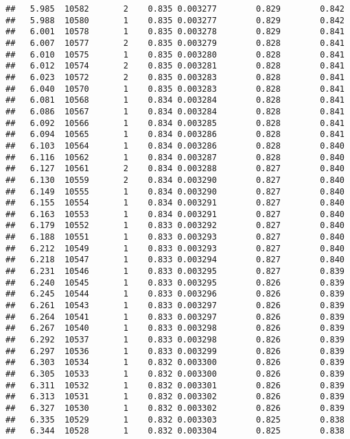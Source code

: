 \documentclass[
]{book}
\begin{document}
\begin{verbatim}
##   5.985  10582       2    0.835 0.003277        0.829        0.842
##   5.988  10580       1    0.835 0.003277        0.829        0.842
##   6.001  10578       1    0.835 0.003278        0.829        0.841
##   6.007  10577       2    0.835 0.003279        0.828        0.841
##   6.010  10575       1    0.835 0.003280        0.828        0.841
##   6.012  10574       2    0.835 0.003281        0.828        0.841
##   6.023  10572       2    0.835 0.003283        0.828        0.841
##   6.040  10570       1    0.835 0.003283        0.828        0.841
##   6.081  10568       1    0.834 0.003284        0.828        0.841
##   6.086  10567       1    0.834 0.003284        0.828        0.841
##   6.092  10566       1    0.834 0.003285        0.828        0.841
##   6.094  10565       1    0.834 0.003286        0.828        0.841
##   6.103  10564       1    0.834 0.003286        0.828        0.840
##   6.116  10562       1    0.834 0.003287        0.828        0.840
##   6.127  10561       2    0.834 0.003288        0.827        0.840
##   6.130  10559       2    0.834 0.003290        0.827        0.840
##   6.149  10555       1    0.834 0.003290        0.827        0.840
##   6.155  10554       1    0.834 0.003291        0.827        0.840
##   6.163  10553       1    0.834 0.003291        0.827        0.840
##   6.179  10552       1    0.833 0.003292        0.827        0.840
##   6.188  10551       1    0.833 0.003293        0.827        0.840
##   6.212  10549       1    0.833 0.003293        0.827        0.840
##   6.218  10547       1    0.833 0.003294        0.827        0.840
##   6.231  10546       1    0.833 0.003295        0.827        0.839
##   6.240  10545       1    0.833 0.003295        0.826        0.839
##   6.245  10544       1    0.833 0.003296        0.826        0.839
##   6.261  10543       1    0.833 0.003297        0.826        0.839
##   6.264  10541       1    0.833 0.003297        0.826        0.839
##   6.267  10540       1    0.833 0.003298        0.826        0.839
##   6.292  10537       1    0.833 0.003298        0.826        0.839
##   6.297  10536       1    0.833 0.003299        0.826        0.839
##   6.303  10534       1    0.832 0.003300        0.826        0.839
##   6.305  10533       1    0.832 0.003300        0.826        0.839
##   6.311  10532       1    0.832 0.003301        0.826        0.839
##   6.313  10531       1    0.832 0.003302        0.826        0.839
##   6.327  10530       1    0.832 0.003302        0.826        0.839
##   6.335  10529       1    0.832 0.003303        0.825        0.838
##   6.344  10528       1    0.832 0.003304        0.825        0.838

\end{verbatim}
\end{document}
